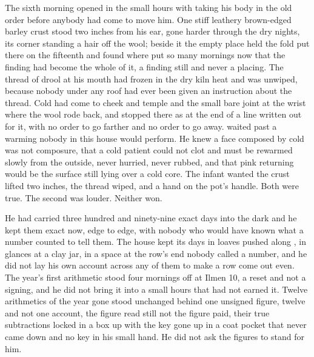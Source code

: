 
The sixth morning opened in the small hours with  taking his body in the old order before anybody had come to move him. One stiff leathery brown-edged barley crust stood two inches from his ear, gone harder through the dry nights, its corner standing a hair off the wool; beside it the empty place held the fold put there on the fifteenth and found where put so many mornings now that the finding had become the whole of it, a finding still and never a placing. The thread of drool at his mouth had frozen in the dry kiln heat and was unwiped, because nobody under any roof had ever been given an instruction about the thread. Cold had come to cheek and temple and the small bare joint at the wrist where the wool rode back, and stopped there as at the end of a line written out for it, with no order to go farther and no order to go away.  waited past a warming nobody in this house would perform. He knew a face composed by cold was not composure, that a cold patient could not clot and must be rewarmed slowly from the outside, never hurried, never rubbed, and that pink returning would be the surface still lying over a cold core. The infant wanted the crust lifted two inches, the thread wiped, and a hand on the pot's handle. Both were true. The second was louder. Neither won.

He had carried three hundred and ninety-nine exact days into the dark and he kept them exact now, edge to edge, with nobody who would have known what a number counted to tell them. The house kept its days in loaves pushed along , in glances at a clay jar, in a space at the row's end nobody called a number, and he did not lay his own account across any of them to make a row come out even. The year's first arithmetic stood four mornings off at Ilmen 10, a reset and not a signing, and he did not bring it into a small hours that had not earned it. Twelve arithmetics of the year gone stood unchanged behind one unsigned figure, twelve and not one account, the figure read still not the figure paid, their true subtractions locked in a box up  with the key gone up in a coat pocket that never came down and no key in his small hand. He did not ask the figures to stand for him.

